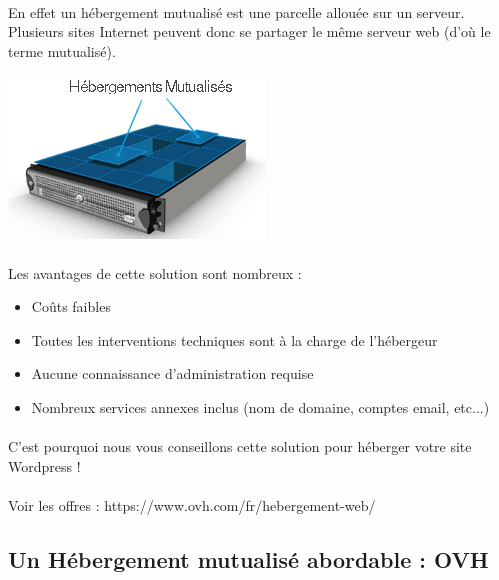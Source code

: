 \documentclass[10pt,a4paper]{article}
\begin{document}
\paragraph{}En effet un hébergement mutualisé est une parcelle allouée sur un serveur. Plusieurs sites Internet peuvent donc se partager le même serveur web (d'où le terme mutualisé).
\begin{center}
\includegraphics[scale=0.5]{img/0007.png}
\end{center}
\paragraph{}Les avantages de cette solution sont nombreux :
\begin{itemize}
\item Coûts faibles
\item Toutes les interventions techniques sont à la charge de l'hébergeur
\item Aucune connaissance d'administration requise
\item Nombreux services annexes inclus (nom de domaine, comptes email, etc...)
\end{itemize}
\paragraph{}C'est pourquoi nous vous conseillons cette solution pour héberger votre site Wordpress !
\paragraph{}Voir les offres : https://www.ovh.com/fr/hebergement-web/
\subsection{Un Hébergement mutualisé abordable : OVH}
\end{document}
